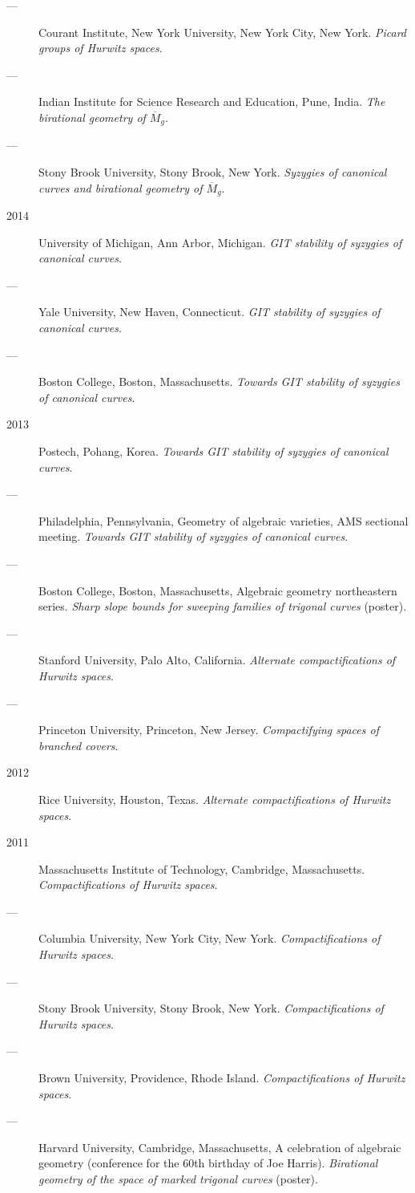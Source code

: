 \documentclass[11pt]{article}
\begin{document}
\begin{description}
\item[{---}] Courant Institute, New York University, New York City, New York. \emph{Picard groups of Hurwitz spaces}.
\item[{---}] Indian Institute for Science Research and Education, Pune, India. \emph{The birational geometry of \(\overline M_g\)}.
\item[{---}] Stony Brook University, Stony Brook, New York. \emph{Syzygies of canonical curves and birational geometry of \(\overline M_g\)}.
\item[{2014}] University of Michigan, Ann Arbor, Michigan. \emph{GIT stability of syzygies of canonical curves}.
\item[{---}] Yale University, New Haven, Connecticut. \emph{GIT stability of syzygies of canonical curves}.
\item[{---}] Boston College, Boston, Massachusetts. \emph{Towards GIT stability of syzygies of canonical curves}.
\item[{2013}] Postech, Pohang, Korea. \emph{Towards GIT stability of syzygies of canonical curves}.
\item[{---}] Philadelphia, Pennsylvania, Geometry of algebraic varieties, AMS sectional meeting. \emph{Towards GIT stability of syzygies of canonical curves}.
\item[{---}] Boston College, Boston, Massachusetts, Algebraic geometry northeastern series. \emph{Sharp slope bounds for sweeping families of trigonal curves} (poster).
\item[{---}] Stanford University, Palo Alto, California. \emph{Alternate compactifications of Hurwitz spaces}.
\item[{---}] Princeton University, Princeton, New Jersey. \emph{Compactifying spaces of branched covers}.
\item[{2012}] Rice University, Houston, Texas. \emph{Alternate compactifications of Hurwitz spaces}.
\item[{2011}] Massachusetts Institute of Technology, Cambridge, Massachusetts. \emph{Compactifications of Hurwitz spaces}.
\item[{---}] Columbia University, New York City, New York. \emph{Compactifications of Hurwitz spaces}.
\item[{---}] Stony Brook University, Stony Brook, New York. \emph{Compactifications of Hurwitz spaces}.
\item[{---}] Brown University, Providence, Rhode Island. \emph{Compactifications of Hurwitz spaces}.
\item[{---}] Harvard University, Cambridge, Massachusetts, A celebration of algebraic geometry (conference for the 60th birthday of Joe Harris). \emph{Birational geometry of the space of marked trigonal curves} (poster).
\end{description}
\end{document}
